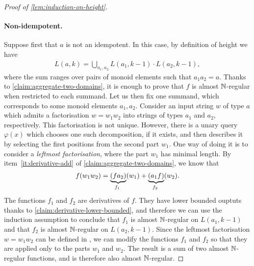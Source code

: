 \begin{proof}[Proof of \cref{lem:induction-on-height}]
\paragraph*{Non-idempotent.} Suppose first that $a$ is not an idempotent. In this case, by definition of  height we have 
\begin{align*}
L(a,k) = \bigcup_{a_1,a_2} L(a_1,k-1) \cdot L(a_2,k-1),
\end{align*}
where the sum ranges over pairs of monoid elements such that $a_1 a_2 =a$.
Thanks to \cref{claim:aggregate-two-domains}, it is enough to prove that $f$ is almost ${\mathbb N}$-regular when restricted to each  summand. Let us then fix one summand, which corresponds to some monoid elements $a_1,a_2$. Consider an input string $w$ of type $a$ which admits  a factorisation $w = w_1 w_2$ into strings of types $a_1$ and $a_2$, respectively. This factorisation is not unique. However, there is a unary query $\varphi(x)$ which chooses one such  decomposition, if it exists, and then describes it by selecting the first positions from the second part $w_1$. One way of doing it is to consider a \emph{leftmost factorisation}, where the part $w_1$ has  minimal length. 
 By item~\ref{it:derivative-add} of \cref{claim:aggregate-two-domains}, we know that 
\begin{align*}
f(w_1 w_2) = \myunderbrace{(f a_2)}{$f_1$}(w_1) + \myunderbrace{(a_1  f)}{$f_2$}(w_2).
\end{align*}
The functions $f_1$ and $f_2$ are derivatives of $f$. They have lower bounded ouptuts thanks to \cref{claim:derivative-lower-bounded}, and  therefore we can use the induction assumption to conclude that $f_1$ is almost ${\mathbb N}$-regular on $L(a_1,k-1)$ and that $f_2$ is almost ${\mathbb N}$-regular on $L(a_2,k-1)$. Since the leftmost factorisation $w = w_1 w_2$ can be defined in \mso, we can modify the functions $f_1$ and $f_2$ so that they are applied only to the parts $w_1$ and $w_2$. The result is a sum of two almost ${\mathbb N}$-regular functions, and is therefore also almost ${\mathbb N}$-regular.


\end{proof}
